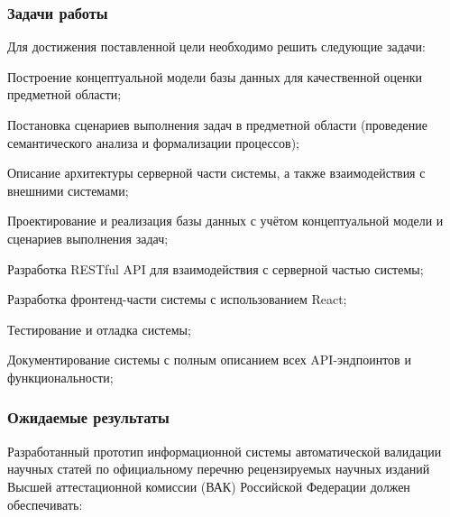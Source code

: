 \subsubsection{Задачи работы}

Для достижения поставленной цели необходимо решить следующие задачи:

\begin{compactenum}
	\item Построение концептуальной модели базы данных для качественной оценки предметной области;
	\item Постановка сценариев выполнения задач в предметной области (проведение семантического анализа и формализации процессов);
	\item Описание архитектуры серверной части системы, а также взаимодействия с внешними системами;
	\item Проектирование и реализация базы данных с учётом концептуальной модели и сценариев выполнения задач;
	\item Разработка RESTful API для взаимодействия с серверной частью системы;
	\item Разработка фронтенд-части системы с использованием React;
	\item Тестирование и отладка системы;
	\item Документирование системы с полным описанием всех API-эндпоинтов и функциональности;
\end{compactenum}

\subsubsection{Ожидаемые результаты}
Разработанный прототип информационной системы автоматической валидации научных статей по
официальному перечню рецензируемых научных изданий Высшей аттестационной комиссии (ВАК)
Российской Федерации должен обеспечивать:

